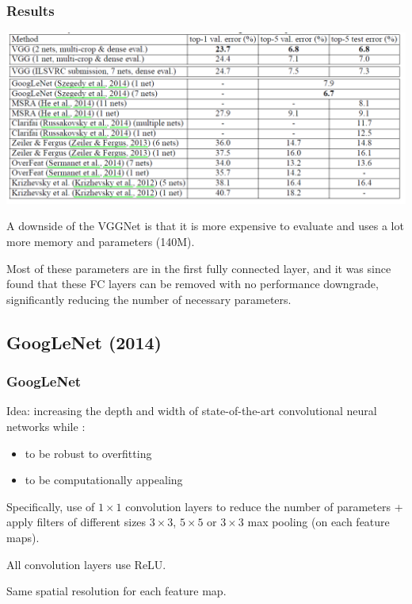 \begin{frame}
	\frametitle{Results}
	
\begin{center}
	\includegraphics[scale=0.6]{figs/results_VGG}
\end{center}
	

	A downside of the VGGNet is that it is more expensive to evaluate and uses a lot more memory and parameters (140M). 
	
	Most of these parameters are in the first fully connected layer, and it was since found that these FC layers can be removed with no performance downgrade, significantly reducing the number of necessary parameters.
	
\end{frame}


\subsection{GoogLeNet (2014)}

\begin{frame}
	\frametitle{GoogLeNet}
	
	
	\bigskip
	
	Idea: increasing the depth and width of state-of-the-art convolutional neural networks while :
	\begin{itemize}
		\item to be robust to overfitting
		
		\smallskip
		\item to be computationally appealing 
	\end{itemize}
	
	\bigskip
	
	Specifically, use of $1\times 1$ convolution layers to reduce the number of parameters + apply filters of different sizes $3 \times 3$, $5 \times 5$ or $3 \times 3$ max pooling (on each feature maps).

\bigskip 

All convolution layers use ReLU. 

\bigskip

Same spatial resolution for each feature map.

	
\end{frame}

